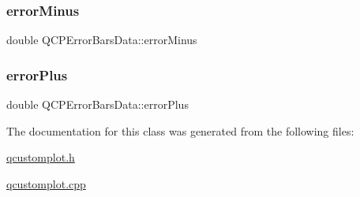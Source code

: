 \subsubsection{\texorpdfstring{error\+Minus}{errorMinus}}
{\footnotesize\ttfamily double Q\+C\+P\+Error\+Bars\+Data\+::error\+Minus}

\mbox{\label{class_q_c_p_error_bars_data_ad1283c99fbfccf37a0226b1df52f0776}} 
\subsubsection{\texorpdfstring{error\+Plus}{errorPlus}}
{\footnotesize\ttfamily double Q\+C\+P\+Error\+Bars\+Data\+::error\+Plus}



The documentation for this class was generated from the following files\+:\begin{DoxyCompactItemize}
\item 
\hyperlink{qcustomplot_8h}{qcustomplot.\+h}\item 
\hyperlink{qcustomplot_8cpp}{qcustomplot.\+cpp}\end{DoxyCompactItemize}
